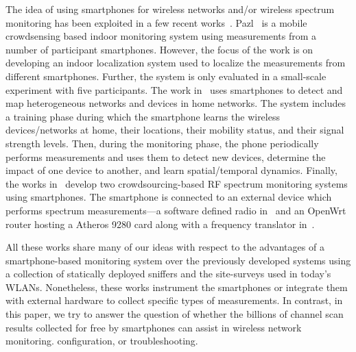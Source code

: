 The idea of using smartphones for wireless networks and/or wireless
spectrum monitoring has been exploited in a few recent
works~\cite{radu:cnsm2013,nychis:hotwireless2014,nika:hotwireless2014,zhang:hotmobile2015}. Pazl~\cite{radu:cnsm2013}
is a mobile crowdsensing based indoor \wifi{} monitoring system using
measurements from a number of participant smartphones. However, the
focus of the work is on developing an indoor localization system used
to localize the measurements from different smartphones. Further, the
system is only evaluated in a small-scale experiment with five
participants. The work in~\cite{nychis:hotwireless2014} uses
smartphones to detect and map heterogeneous networks and devices in
home networks. The system includes a training phase during which the
smartphone learns the wireless devices/networks at home, their
locations, their mobility status, and their signal strength
levels. Then, during the monitoring phase, the phone periodically
performs measurements and uses them to detect new devices, determine
the impact of one device to another, and learn spatial/temporal
dynamics. Finally, the works
in~\cite{nika:hotwireless2014,zhang:hotmobile2015} develop two
crowdsourcing-based RF spectrum monitoring systems using
smartphones. The smartphone is connected to an external device which
performs spectrum measurements---a software defined radio
in~\cite{nika:hotwireless2014} and an OpenWrt router hosting a Atheros
9280 card along with a frequency translator
in~\cite{zhang:hotmobile2015}.

All these works share many of our ideas with respect to the advantages
of a smartphone-based monitoring system over the previously developed
systems using a collection of statically deployed sniffers and the
site-surveys used in today's WLANs. Nonetheless, these works
instrument the smartphones or integrate them with external hardware to
collect specific types of measurements. In contrast, in this paper, we
try to answer the question of whether the billions of \wifi{} channel
scan results collected for free by smartphones can assist in wireless
network monitoring. configuration, or troubleshooting.
